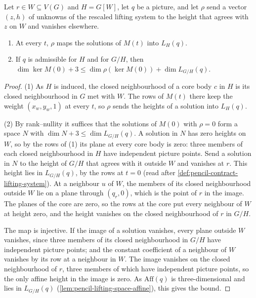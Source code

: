 \begin{lemma}
  \label{lem:pencil-contract-kernel-bound}
  \leanok
  Let $r \in W \subseteq V(G)$ and $H = G[W]$, let $q$ be a picture, and
  let $\rho$ send a vector $(z, h)$ of unknowns of the rescaled lifting
  system to the height that agrees with $z$ on $W$ and vanishes
  elsewhere.
  \begin{enumerate}
    \item At every $t$, $\rho$ maps the solutions of $M(t)$ into
      $L_H(q)$.
    \item If $q$ is admissible for $H$ and for $G/H$, then
      $\dim \ker M(0) + 3 \le \dim \rho(\ker M(0)) + \dim L_{G/H}(q)$.
  \end{enumerate}
\end{lemma}
\begin{proof}
  \leanok
  (1) As $H$ is induced, the closed neighbourhood of a core body $c$ in
  $H$ is its closed neighbourhood in $G$ met with $W$. The rows of $M(t)$
  there keep the weight $(x_w, y_w, 1)$ at every $t$, so $\rho$ sends the
  heights of a solution into $L_H(q)$.

  (2) By rank--nullity it suffices that the solutions of $M(0)$ with
  $\rho = 0$ form a space $N$ with $\dim N + 3 \le \dim L_{G/H}(q)$. A
  solution in $N$ has zero heights on $W$, so by the rows of (1) its
  plane at every core body is zero: three members of each closed
  neighbourhood in $H$ have independent picture points. Send a solution
  in $N$ to the height of $G/H$ that agrees with it outside $W$ and
  vanishes at $r$. This height lies in $L_{G/H}(q)$, by the rows at
  $t = 0$ (read after \cref{def:pencil-contract-lifting-system}). At a
  neighbour $u$ of $W$, the members of its closed neighbourhood outside
  $W$ lie on a plane through $(q_r, 0)$, which is the point of $r$ in the
  image. The planes of the core are zero,
  so the rows at the core put every neighbour of $W$ at height zero, and
  the height vanishes on the closed neighbourhood of $r$ in $G/H$.

  The map is injective. If the image of a solution vanishes, every plane
  outside $W$ vanishes, since three members of its closed neighbourhood
  in $G/H$ have independent picture points; and the constant coefficient
  of a neighbour of $W$ vanishes by its row at a neighbour in $W$. The
  image vanishes on the closed neighbourhood of $r$, three members of
  which have independent picture points, so the only affine height in the
  image is zero. As $\mathrm{Aff}(q)$ is three-dimensional and lies in
  $L_{G/H}(q)$ (\cref{lem:pencil-lifting-space-affine}), this gives the
  bound.
\end{proof}


